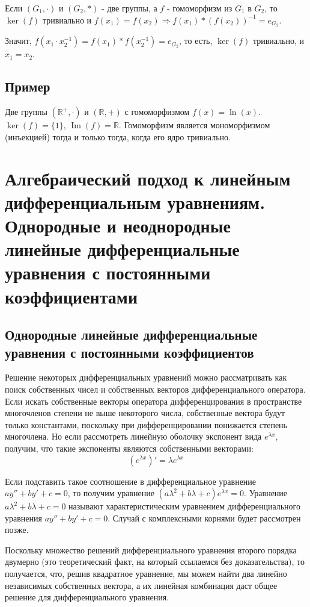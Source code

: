 \documentclass[12pt]{article}
\begin{document}
        Если $(G_1,\cdot)$ и $(G_2,*)$ - две группы, а $f$ - гомоморфизм из $G_1$ в $G_2$, то $\operatorname{ker}(f)$ тривиально и $f(x_1)=f(x_2)\Rightarrow f(x_1)*(f(x_2))^{-1}=e_{G_2}$.

        Значит, $f(x_1\cdot x_2^{-1})=f(x_1)*f(x_2^{-1})=e_{G_2}$, то есть, $\operatorname{ker}(f)$ тривиально, и $x_1=x_2$.

        \subsection{Пример}

        Две группы $(\mathbb{R}^{+},\cdot)$ и $(\mathbb{R},+)$ с гомоморфизмом $f(x) = \ln(x)$. $\ker(f) = \{1\}$, $\operatorname{Im}(f) = \mathbb{R}$. Гомоморфизм является мономорфизмом (инъекцией) тогда и только тогда, когда его ядро тривиально.

        \section{Алгебраический подход к линейным дифференциальным уравнениям. Однородные и неоднородные линейные дифференциальные уравнения с постоянными коэффициентами}

        \subsection{Однородные линейные дифференциальные уравнения с постоянными коэффициентов}
        Решение некоторых дифференциальных уравнений можно рассматривать как поиск
        собственных чисел и собственных векторов дифференциального оператора.  Если искать собственные векторы оператора дифференцирования в пространстве многочленов степени не выше некоторого числа, собственные вектора будут только константами, поскольку при дифференцировании понижается степень многочлена. Но если рассмотреть линейную оболочку экспонент вида $e^{\lambda x}$, получим, что такие экспоненты являются собственными векторами:
\[
    (e^{\lambda x})' = \lambda e^{\lambda x}
\]

Если подставить такое соотношение в дифференциальное уравнение $ay'' + by' + c = 0$, то получим уравнение $(a\lambda^2 + b\lambda + c)e^{\lambda x} = 0$.
Уравнение $a\lambda^2 + b\lambda + c = 0$ называют характеристическим уравнением дифференциального уравнения $ay'' + by' + c = 0$. Случай с комплексными корнями будет рассмотрен позже.

Поскольку множество решений дифференциального уравнения второго порядка двумерно (это теоретический факт, на который ссылаемся без доказательства), то получается, что, решив квадратное уравнение, мы можем найти два линейно независимых собственных вектора, а их линейная комбинация даст общее решение для дифференциального уравнения.
\end{document}
